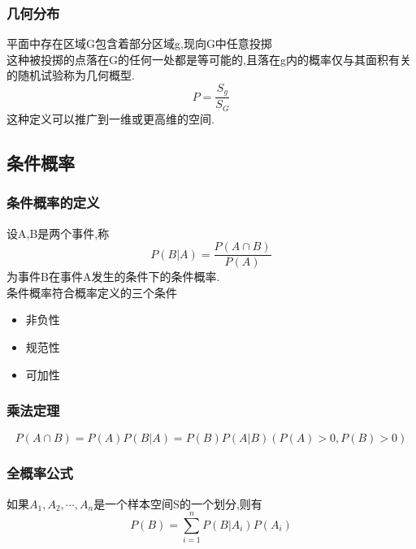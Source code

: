 \documentclass{ctexart}
\begin{document}
\subsubsection{几何分布}
平面中存在区域G包含着部分区域g,现向G中任意投掷\\
这种被投掷的点落在G的任何一处都是等可能的,且落在g内的概率仅与其面积有关的随机试验称为几何概型.
\begin{equation}
	P=\frac{S_g}{S_G}
\end{equation}
这种定义可以推广到一维或更高维的空间.\\
\subsection{条件概率}
\subsubsection{条件概率的定义}
设A,B是两个事件,称
\begin{equation}
	P(B|A)=\frac{P(A\cap B)}{P(A)}
\end{equation}
为事件B在事件A发生的条件下的条件概率.\\
条件概率符合概率定义的三个条件
\begin{itemize}
	\item 非负性
	\item 规范性
	\item 可加性
\end{itemize}
\subsubsection{乘法定理}
\begin{equation}
	P(A\cap B)=P(A)P(B|A)=P(B)P(A|B)(P(A)>0,P(B)>0)
\end{equation}
\subsubsection{全概率公式}
如果$A_1,A_2,\cdots,A_n$是一个样本空间S的一个划分,则有
\begin{equation}
	P(B)=\sum_{i=1}^nP(B|A_i)P(A_i)
\end{equation}
\end{document}
